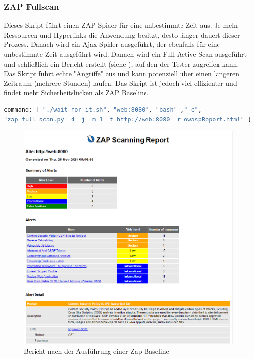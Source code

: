 \subsubsection{ZAP Fullscan}


Dieses Skript führt einen ZAP Spider für eine unbestimmte Zeit aus.
Je mehr Ressourcen und Hyperlinks die Anwendung besitzt, desto länger
dauert dieser Prozess. Danach wird ein Ajax Spider ausgeführt, der
ebenfalls für eine unbestimmte Zeit ausgeführt wird. Danach wird ein
Full Active Scan ausgeführt und schließlich ein Bericht erstellt
(siehe ), auf  den der Tester zugreifen kann.
Das Skript führt echte "Angriffe" aus  und kann potenziell über einen
längeren Zeitraum (mehrere Stunden) laufen. Das Skript ist jedoch viel
effizienter und findet mehr  Sicherheitslücken als ZAP Baseline.

\begin{lstlisting}[language=Dockerfile,label={lst:fullscan},caption={ZAP Fullscan Ausführungsbefehl}]
command: [ "./wait-for-it.sh", "web:8080", "bash" ,"-c",
"zap-full-scan.py -d -j -m 1 -t http://web:8080 -r owaspReport.html" ]

\end{lstlisting}


\begin{figure}[H]
    \centering
    \includegraphics[scale=0.5]{images/zap-report}
    \caption{Bericht nach der Ausführung einer Zap Baseline} \label{fig:baseline}
\end{figure}
